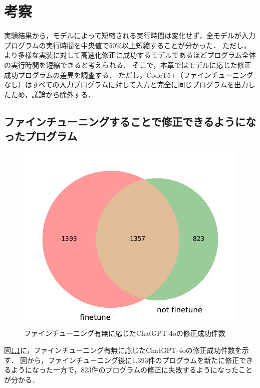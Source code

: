 \documentclass[11pt]{jreport}
\newcommand{\fix}[1]{#1}
\newcommand{\fixtwo}[1]{#1}
\begin{document}


\chapter{\fix{考察}}


\fix{実験結果から，モデルによって短縮される実行時間は変化せず，全モデルが入力プログラムの実行時間を中央値で50\%以上短縮することが分かった．}
\fix{ただし，より多様な実装に対して高速化修正に成功するモデルであるほどプログラム全体の実行時間を短縮できると考えられる．}
\fix{そこで，本章ではモデルに応じた修正成功プログラムの差異を調査する．}
\fix{ただし，CodeT5+（ファインチューニングなし）はすべての入力プログラムに対して入力と完全に同じプログラムを出力したため，議論から除外する．}




\section{ファインチューニングすることで修正できるようになったプログラム}



\begin{figure}[t]
\begin{center}
\includegraphics[width=0.5\linewidth]{Omori_fig/figure-venn2.pdf}
\caption{\fix{ファインチューニング有無に応じたChatGPT-4oの修正成功件数}}
\label{fig:eval-1:result-fast-venn2}
\end{center}
\end{figure}


\fixtwo{図\ref{fig:eval-1:result-fast-venn2}に，ファインチューニング有無に応じたChatGPT-4oの修正成功件数を示す．}
図から，ファインチューニング後に1,393件のプログラムを新たに修正できるようになった一方で，823件のプログラムの修正に失敗するようになったことが分かる．
\end{document}
